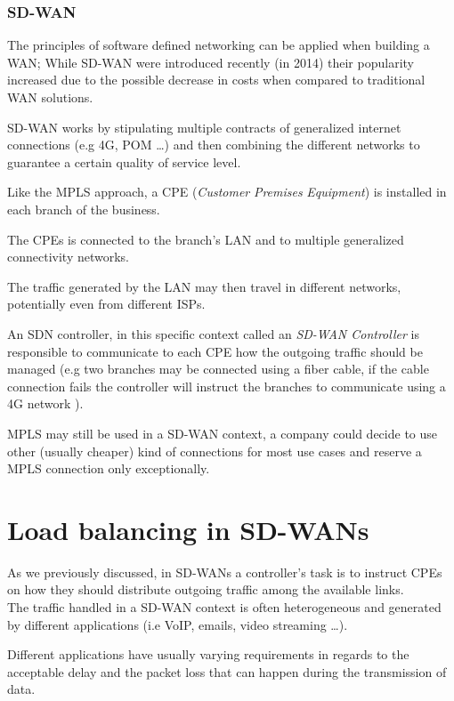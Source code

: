 \documentclass{article}
\begin{document}
   \subsubsection{SD-WAN}
   The principles of software defined networking can be applied when building a WAN;
   While SD-WAN were introduced recently (in 2014) their popularity increased due to the possible decrease in costs when compared to traditional WAN solutions.
   
   SD-WAN works by stipulating multiple contracts of generalized internet connections (e.g 4G, POM \dots) and then combining the different networks to guarantee a certain quality of service level.
  
   Like the MPLS approach, a CPE (\textit{Customer} \textit{Premises} \textit{Equipment}) is installed in each branch of the business.
   
   The CPEs is connected to the branch's LAN and to multiple generalized connectivity networks.
  
   The traffic generated by the LAN may then travel in different networks, potentially even from different ISPs.
   
   An SDN controller, in this specific context called an \textit{SD-WAN Controller} is responsible to communicate to each CPE how the outgoing traffic should be managed (e.g two branches may be connected using a fiber cable, if the cable connection fails the controller will instruct the branches to communicate using a 4G network ).
   
   MPLS may still be used in a SD-WAN context, a company could decide to use other (usually cheaper) kind of connections for most use cases and reserve a MPLS connection only exceptionally.
   
 
 \section{Load balancing in SD-WANs}
 
 As we previously discussed, in SD-WANs a controller's task is to instruct CPEs on how they should distribute outgoing traffic among the available links. \\
 
 The traffic handled in a SD-WAN context is often heterogeneous and generated by different applications (i.e VoIP, emails, video streaming \dots).
 
 Different applications have usually varying requirements in regards to the acceptable delay and the packet loss that can happen during the transmission of data.
 
\end{document}
